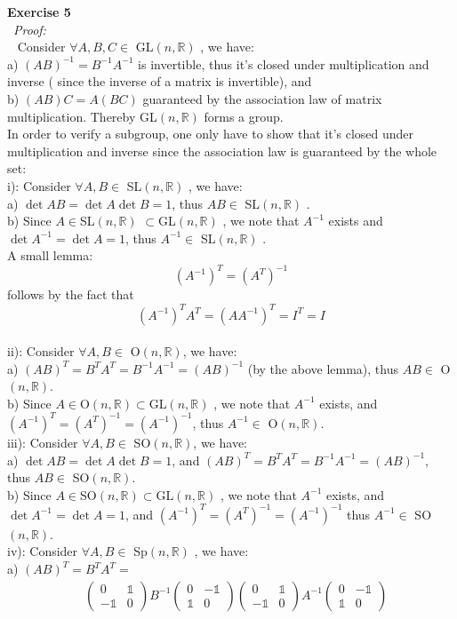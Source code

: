 \documentclass[12pt]{article}
\def\ep#1#2{{\bf Exercise #1}\\~{\it Proof:}\\~#2\\[1em]}
\newcommand{\eq}[1]{\begin{align*}#1\end{align*}}
\begin{document}
\ep{5}{
\def\mat{Mat$(n\times n,\mathbb{R})$}
\def\GL{GL$(n,\mathbb{R})$ }
\def\SL{SL$(n,\mathbb{R})$ }
\def\O{O$(n,\mathbb{R})$}
\def\SO{SO$(n,\mathbb{R})$}
\def\Sp{Sp$(n,\mathbb{R})$ }
\def\1{\mathbb{1}}
Consider $\forall A,B,C\in$ \GL, we have:\\
a) ${\left(AB\right)}^{-1}=B^{-1}A^{-1}$ is invertible, thus it's closed under multiplication and inverse ( since the inverse of a matrix is invertible), and\\
b) $(AB)C=A(BC)$ guaranteed by the association law of matrix multiplication.
Thereby \GL forms a group.\\
In order to verify a subgroup, one only have to show that it's closed under multiplication and inverse since the association law is guaranteed by the whole set:\\
i): Consider $\forall A,B\in$ \SL, we have:\\
 a) $\det{AB}=\det{A}\det{B}=1$, thus $AB\in$ \SL.\\
 b) Since $A\in $\SL$\subset$\GL, we note that $A^{-1}$ exists and $\det{A^{-1}}=\det{A}=1$, thus $A^{-1}\in$ \SL.\\
[0.5em]
A small lemma:
\[
(A^{-1})^{T}=(A^T)^{-1}
\]
follows by the fact that
\[
(A^{-1})^{T}A^T=(AA^{-1})^T=I^T=I
\]
\\[0.5 em]
ii): Consider $\forall A,B\in$ \O, we have:\\
 a) ${(AB)}^{T}=B^TA^T=B^{-1}A^{-1}={(AB)}^{-1}$ (by the above lemma), thus $AB\in$ \O.\\
 b) Since $A\in $\O$\subset$\GL, we note that $A^{-1}$ exists, and ${(A^{-1})}^{T}={(A^{T})}^{-1}={(A^{-1})}^{-1}$, thus $A^{-1}\in$ \O.\\
[0.5em] iii): Consider $\forall A,B\in$ \SO, we have:\\
 a) $\det{AB}=\det{A}\det{B}=1$, and ${(AB)}^{T}=B^TA^T=B^{-1}A^{-1}={(AB)}^{-1}$, thus $AB\in$ \SO.\\
 b) Since $A\in $\SO$\subset$\GL, we note that $A^{-1}$ exists, and $\det{A^{-1}}=\det{A}=1$, and ${(A^{-1})}^{T}={(A^{T})}^{-1}={(A^{-1})}^{-1}$ thus $A^{-1}\in$ \SO.\\
[0.5em] iv): Consider $\forall A,B\in$ \Sp, we have:\\
 a) ${(AB)}^T=B^{T}A^{T}=$
 \eq{
 &\begin{pmatrix}0&\1\\ -\1&0\end{pmatrix}B^{-1}\begin{pmatrix}0&-\1\\ \1&0\end{pmatrix}\begin{pmatrix}0&\1\\ -\1&0\end{pmatrix}A^{-1}\begin{pmatrix}0&-\1\\ \1&0\end{pmatrix}
}}
\end{document}
